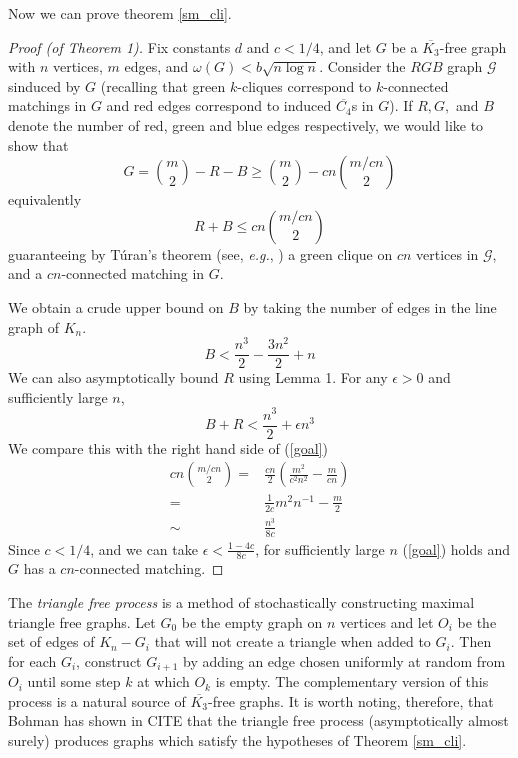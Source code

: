 Now we can prove theorem \ref{sm_cli}.

\begin{proof}[Proof (of Theorem 1)]
Fix constants $d$ and $c < 1/4$, and let $G$ be a $\overline{K_3}$-free graph with $n$ vertices, $m$ edges, and $\omega(G) < b\sqrt{n\log n}$.  Consider the $RGB$ graph $\mathcal{G}$ sinduced by $G$ (recalling that green $k$-cliques correspond to $k$-connected matchings in $G$ and red edges correspond to induced $\overline{C_4}$s in $G$).  If $R, G,$ and $B$ denote the number of red, green and blue edges respectively, we would like to show that \[G = {m\choose 2} - R - B \geq {m\choose 2} - cn{m/cn\choose 2}\] equivalently
\begin{equation}
	R + B \leq cn{m/cn\choose 2}\label{goal}
\end{equation}
guaranteeing by T\'{u}ran's theorem (see, \textit{e.g.}, \cite{dwest}) a green clique on $cn$ vertices in $\mathcal{G}$, and a $cn$-connected matching in $G$.

We obtain a crude upper bound on $B$ by taking the number of edges in the line graph of $K_n$.
\begin{equation}
	B < \frac{n^3}{2} - \frac{3n^2}{2} + n
\end{equation}
We can also asymptotically bound $R$ using Lemma 1.  For any $\epsilon > 0$ and sufficiently large $n$, \[B + R < \frac{n^3}{2} + \epsilon n^3\]
We compare this with the right hand side of (\ref{goal})
\begin{eqnarray}
	cn{m/cn\choose 2} =&\displaystyle \frac{cn}{2}\left(\frac{m^2}{c^2n^2} - \frac{m}{cn}\right)\\
	=& \displaystyle \frac{1}{2c}m^2n^{-1} - \frac{m}{2}\\
	\sim&   \displaystyle \frac{n^3}{8c}
\end{eqnarray}
Since $c < 1/4$, and we can take $\epsilon < \frac{1-4c}{8c}$, for sufficiently large $n$ (\ref{goal}) holds and $G$ has a $cn$-connected matching.
\end{proof}
The \textit{triangle free process} is a method of stochastically constructing maximal triangle free graphs.  Let $G_0$ be the empty graph on $n$ vertices and let $O_i$ be the set of edges of $K_n- G_i$ that will not create a triangle when added to $G_i$.  Then for each $G_i$, construct $G_{i+1}$ by adding an edge chosen uniformly at random from $O_i$ until some step $k$ at which $O_k$ is empty.  The complementary version of this process is a natural source of $\overline{K_3}$-free graphs.  It is worth noting, therefore, that Bohman has shown in CITE that the triangle free process (asymptotically almost surely) produces graphs which satisfy the hypotheses of Theorem \ref{sm_cli}.   

